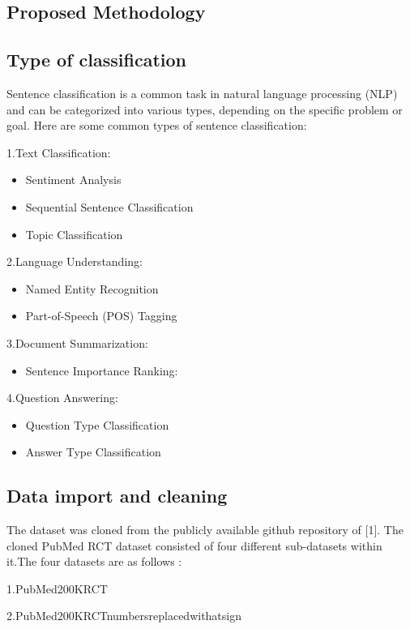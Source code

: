 \documentclass[12pt,a4paper]{report}     %
\begin{document}
\begin{normalsize}
{\section{Proposed Methodology}
\subsection{Type of classification}
Sentence classification is a common task in natural language processing (NLP) and can be categorized into various types, depending on the specific problem or goal. Here are some common types of sentence classification:

1.Text Classification: 
    \begin{itemize}[left=2cm]
        \item Sentiment Analysis
        \item Sequential Sentence Classification
        \item Topic Classification
    \end{itemize}

2.Language Understanding:
    \begin{itemize}[left=2cm]
        \item Named Entity Recognition
        \item Part-of-Speech (POS) Tagging
    \end{itemize}
    
3.Document Summarization:
    \begin{itemize}[left=2cm]
        \item Sentence Importance Ranking:
    \end{itemize}

4.Question Answering:
    \begin{itemize}[left=2cm]
        \item Question Type Classification
        \item Answer Type Classification
    \end{itemize}
\subsection{Data import and cleaning}
The dataset was cloned from the publicly available github repository of [1]. The cloned PubMed RCT dataset consisted of four different sub-datasets within it.The four datasets are as follows :

1.PubMed\textunderscore200K\textunderscore RCT

2.PubMed\textunderscore200K\textunderscore RCT\textunderscore numbers\textunderscore replaced\textunderscore with\textunderscore at\textunderscore sign

}
\end{normalsize}
\end{document}

